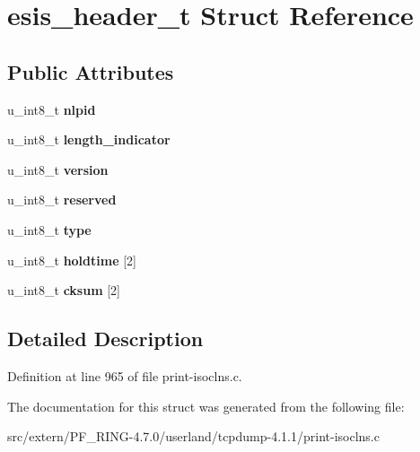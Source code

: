\hypertarget{structesis__header__t}{
\section{esis\_\-header\_\-t Struct Reference}
\label{structesis__header__t}
}
\subsection*{Public Attributes}
\begin{DoxyCompactItemize}
\item 
\hypertarget{structesis__header__t_a009d6770a017b30c4d9a354eead7d07f}{
u\_\-int8\_\-t {\bfseries nlpid}}
\label{structesis__header__t_a009d6770a017b30c4d9a354eead7d07f}

\item 
\hypertarget{structesis__header__t_adbfee6c5e48b627c9ad53bfd34a8093d}{
u\_\-int8\_\-t {\bfseries length\_\-indicator}}
\label{structesis__header__t_adbfee6c5e48b627c9ad53bfd34a8093d}

\item 
\hypertarget{structesis__header__t_a8b51034ad23c90e5d5078a04f20884ca}{
u\_\-int8\_\-t {\bfseries version}}
\label{structesis__header__t_a8b51034ad23c90e5d5078a04f20884ca}

\item 
\hypertarget{structesis__header__t_a9b4bf59f66e16af86c65b02bec4e9644}{
u\_\-int8\_\-t {\bfseries reserved}}
\label{structesis__header__t_a9b4bf59f66e16af86c65b02bec4e9644}

\item 
\hypertarget{structesis__header__t_a8454a14d7babb9cb33eb9d6ff337b730}{
u\_\-int8\_\-t {\bfseries type}}
\label{structesis__header__t_a8454a14d7babb9cb33eb9d6ff337b730}

\item 
\hypertarget{structesis__header__t_a05af9618aabde66bc0c29049249f1753}{
u\_\-int8\_\-t {\bfseries holdtime} \mbox{[}2\mbox{]}}
\label{structesis__header__t_a05af9618aabde66bc0c29049249f1753}

\item 
\hypertarget{structesis__header__t_a944516bc5a77a2eec6fbef0ec9b5831c}{
u\_\-int8\_\-t {\bfseries cksum} \mbox{[}2\mbox{]}}
\label{structesis__header__t_a944516bc5a77a2eec6fbef0ec9b5831c}

\end{DoxyCompactItemize}


\subsection{Detailed Description}


Definition at line 965 of file print-\/isoclns.c.



The documentation for this struct was generated from the following file:\begin{DoxyCompactItemize}
\item 
src/extern/PF\_\-RING-\/4.7.0/userland/tcpdump-\/4.1.1/print-\/isoclns.c\end{DoxyCompactItemize}
